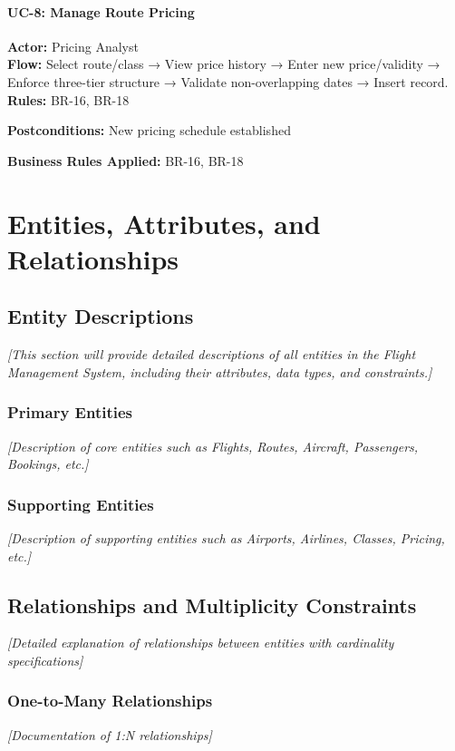 \documentclass[12pt,a4paper,openany]{report}
\begin{document}
\subsubsection*{UC-8: Manage Route Pricing}
\textbf{Actor:} Pricing Analyst\\
\textbf{Flow:} Select route/class → View price history → Enter new price/validity → Enforce three-tier structure → Validate non-overlapping dates → Insert record.\\
\textbf{Rules:} BR-16, BR-18

\textbf{Postconditions:} New pricing schedule established

\textbf{Business Rules Applied:} BR-16, BR-18

\newpage

\chapter{Entities, Attributes, and Relationships}

\section{Entity Descriptions}

\textit{[This section will provide detailed descriptions of all entities in the Flight Management System, including their attributes, data types, and constraints.]}

\subsection{Primary Entities}
\textit{[Description of core entities such as Flights, Routes, Aircraft, Passengers, Bookings, etc.]}

\subsection{Supporting Entities}
\textit{[Description of supporting entities such as Airports, Airlines, Classes, Pricing, etc.]}

\section{Relationships and Multiplicity Constraints}

\textit{[Detailed explanation of relationships between entities with cardinality specifications]}

\subsection{One-to-Many Relationships}
\textit{[Documentation of 1:N relationships]}
\end{document}
